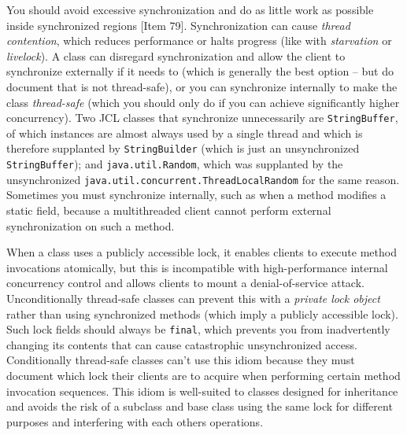 \documentclass[table, xcdraw]{article}%
\begin{document}
You should avoid excessive synchronization and do as little work as possible inside synchronized regions [Item 79]. Synchronization can cause \emph{thread contention}, which reduces performance or halts progress (like with \emph{starvation} or \emph{livelock}). A class can disregard synchronization and allow the client to synchronize externally if it needs to (which is generally the best option -- but do document that is not thread-safe), or you can synchronize internally to make the class \emph{thread-safe} (which you should only do if you can achieve significantly higher concurrency). Two JCL classes that synchronize unnecessarily are \texttt{StringBuffer}, of which instances are almost always used by a single thread and which is therefore supplanted by \texttt{StringBuilder} (which is just an unsynchronized \texttt{StringBuffer}); and \texttt{java.util.Random}, which was supplanted by the unsynchronized \texttt{java.util.concurrent.ThreadLocalRandom} for the same reason. Sometimes you must synchronize internally, such as when a method modifies a static field, because a multithreaded client cannot perform external synchronization on such a method.

When a class uses a publicly accessible lock, it enables clients to execute method invocations atomically, but this is incompatible with high-performance internal concurrency control and allows clients to mount a denial-of-service attack. Unconditionally thread-safe classes can prevent this with a \emph{private lock object} rather than using synchronized methods (which imply a publicly accessible lock). Such lock fields should always be \texttt{final}, which prevents you from inadvertently changing its contents that can cause catastrophic unsynchronized access. Conditionally thread-safe classes can’t use this idiom because they must document which lock their clients are to acquire when performing certain method invocation sequences. This idiom is well-suited to classes designed for inheritance and avoids the risk of a subclass and base class using the same lock for different purposes and interfering with each others operations.
\end{document}
